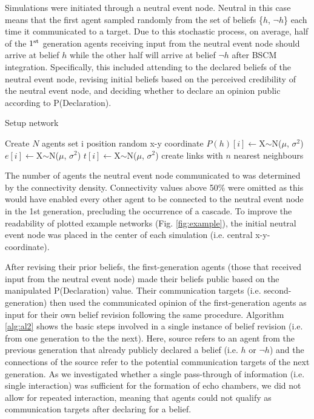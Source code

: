 \documentclass[fleqn,10pt]{wlscirep}
\begin{document}
Simulations were initiated through a neutral event node. Neutral in this case means that the first agent sampled randomly from the set of beliefs \{\(h\), \(\neg h\)\} each time it communicated to a target. Due to this stochastic process, on average, half of the \(1\textsuperscript{st}\) generation agents receiving input from the neutral event node should arrive at belief \(h\) while the other half will arrive at belief \(\neg h\) after BSCM integration. Specifically, this included attending to the declared beliefs of the neutral event node, revising initial beliefs based on the perceived credibility of the neutral event node, and deciding whether to declare an opinion public according to P(Declaration).


\begin{algorithm}[H]
\caption{Setup network}\label{setup}
\begin{algorithmic}[1]
   \label{alg:al1}
    \State Create $N$ agents
        \State set i position random x-y coordinate
     \EndFor
  \EndProcedure
      \State \(P(h)[i]\)\(\gets\)X$\sim$N(\(\mu\), \(\sigma\)\(^2\))
      \State \(e[i]\)\(\gets\)X$\sim$N(\(\mu\), \(\sigma\)\(^2\))
      \State \(t[i]\)\(\gets\)X$\sim$N(\(\mu\), \(\sigma\)\(^2\))
      \State create links with $n$ nearest neighbours 
     \EndFor
  \EndProcedure
\end{algorithmic}
\end{algorithm}

The number of agents the neutral event node communicated to was determined by the connectivity density. Connectivity values above 50\% were omitted as this would have enabled every other agent to be connected to the neutral event node in the 1st generation, precluding the occurrence of a cascade. To improve the readability of plotted example networks (Fig. \ref{fig:example}), the initial neutral event node was  placed in the center of each simulation (i.e. central x-y-coordinate).

After revising their prior beliefs, the first-generation agents (those that received input from the neutral event node) made their beliefs public based on the manipulated P(Declaration) value. Their communication targets (i.e. second-generation) then used the communicated opinion of the first-generation agents as input for their own belief revision following the same procedure. Algorithm \ref{alg:al2} shows the basic steps involved in a single instance of belief revision (i.e. from one generation to the the next). Here, source refers to an agent from the previous generation that already publicly declared a belief (i.e. \(h\) or \(\neg h\)) and the connections of the source refer to the potential communication targets of the next generation. As we investigated whether a single pass-through of information (i.e. single interaction) was sufficient for the formation of echo chambers, we did not allow for repeated interaction, meaning that agents could not qualify as communication targets after declaring for a belief. 
\end{document}

